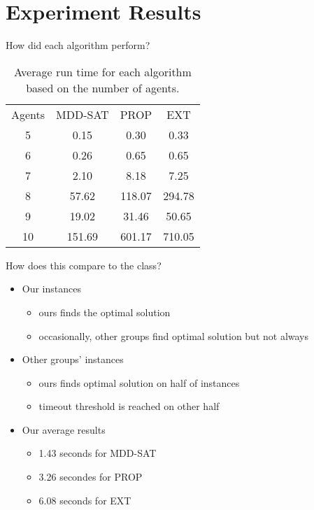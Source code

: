 \documentclass[aspectratio=169,xcolor=svgnames]{beamer}
\theoremstyle{theoremstyle_space}
\begin{document}
\section{Experiment Results}

\begin{frame}[t]{How did each algorithm perform?}
    \begin{table}
    \centering
    \caption{Average run time for each algorithm based on the number of agents.}
        \begin{tabular}{cccc}
        Agents & MDD-SAT & PROP   & EXT     \\
        5      & 0.15    & 0.30   & 0.33    \\
        6      & 0.26    & 0.65   & 0.65    \\
        7      & 2.10    & 8.18   & 7.25    \\
        8      & 57.62   & 118.07 & 294.78  \\
        9      & 19.02   & 31.46  & 50.65   \\
        10     & 151.69  & 601.17 & 710.05  
        \end{tabular}
    \label{Table_1}
    \end{table}
\end{frame}

\begin{frame}[t]{How does this compare to the class?}
    \begin{itemize}
        \item Our instances
        \begin{itemize}
            \item ours finds the optimal solution
            \item occasionally, other groups find optimal solution but not always
        \end{itemize} 
        \item Other groups' instances
        \begin{itemize}
            \item ours finds optimal solution on half of instances
            \item timeout threshold is reached on other half
        \end{itemize}
        \item Our average results
        \begin{itemize}
            \item 1.43 seconds for MDD-SAT
            \item 3.26 secondes for PROP
            \item 6.08 seconds for EXT
        \end{itemize}
        
    \end{itemize}
\end{frame}
    
\end{document}
